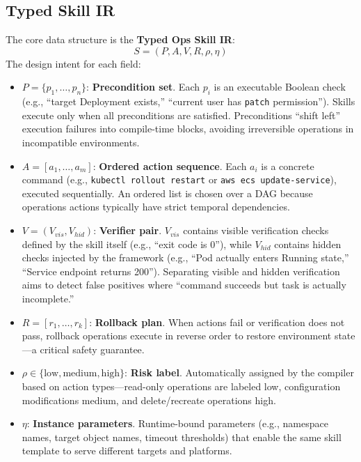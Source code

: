 \documentclass[conference,10pt]{IEEEtran}
\begin{document}
\subsection{Typed Skill IR}

The core data structure is the \textbf{Typed Ops Skill IR}:
\begin{equation}
S = (P, A, V, R, \rho, \eta)
\end{equation}
The design intent for each field:
\begin{itemize}
  \item $P = \{p_1, \ldots, p_n\}$: \textbf{Precondition set}.  Each $p_i$ is an executable Boolean check (e.g., ``target Deployment exists,'' ``current user has \texttt{patch} permission'').  Skills execute only when all preconditions are satisfied.  Preconditions ``shift left'' execution failures into compile-time blocks, avoiding irreversible operations in incompatible environments.
  \item $A = [a_1, \ldots, a_m]$: \textbf{Ordered action sequence}.  Each $a_i$ is a concrete command (e.g., \texttt{kubectl rollout restart} or \texttt{aws ecs update-service}), executed sequentially.  An ordered list is chosen over a DAG because operations actions typically have strict temporal dependencies.
  \item $V = (V_{vis}, V_{hid})$: \textbf{Verifier pair}.  $V_{vis}$ contains visible verification checks defined by the skill itself (e.g., ``exit code is 0''), while $V_{hid}$ contains hidden checks injected by the framework (e.g., ``Pod actually enters Running state,'' ``Service endpoint returns 200'').  Separating visible and hidden verification aims to detect false positives where ``command succeeds but task is actually incomplete.''
  \item $R = [r_1, \ldots, r_k]$: \textbf{Rollback plan}.  When actions fail or verification does not pass, rollback operations execute in reverse order to restore environment state---a critical safety guarantee.
  \item $\rho \in \{\text{low}, \text{medium}, \text{high}\}$: \textbf{Risk label}.  Automatically assigned by the compiler based on action types---read-only operations are labeled low, configuration modifications medium, and delete/recreate operations high.
  \item $\eta$: \textbf{Instance parameters}.  Runtime-bound parameters (e.g., namespace names, target object names, timeout thresholds) that enable the same skill template to serve different targets and platforms.
\end{itemize}
\end{document}
